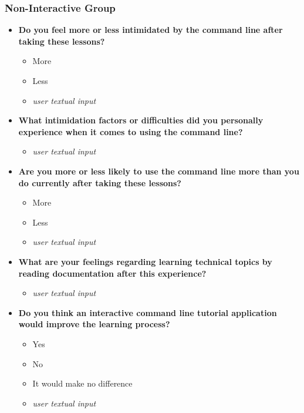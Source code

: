 \subsubsection{Non-Interactive Group}

\begin{itemize}

	\item  \textbf{Do you feel more or less intimidated by the command line after taking these lessons?}
	      \begin{itemize}
		      \item More
		      \item Less
		      \item \textit{user textual input}
	      \end{itemize}

	\item  \textbf{What intimidation factors or difficulties did you personally experience when it comes to using the command line?}
	      \begin{itemize}
		      \item \textit{user textual input}
	      \end{itemize}

	\item  \textbf{Are you more or less likely to use the command line more than you do currently after taking these lessons?}
	      \begin{itemize}
		      \item More
		      \item Less
		      \item \textit{user textual input}
	      \end{itemize}

	\item  \textbf{What are your feelings regarding learning technical topics by reading documentation after this experience?}
	      \begin{itemize}
		      \item \textit{user textual input}
	      \end{itemize}

	\item  \textbf{Do you think an interactive command line tutorial application would improve the learning process?}
	      \begin{itemize}
		      \item Yes
		      \item No
		      \item It would make no difference
		      \item \textit{user textual input}
	      \end{itemize}


\end{itemize}
